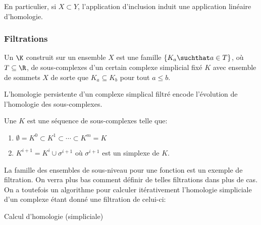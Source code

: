 \begin{remarque}
	En particulier, si $X \subset Y$, l'application d'inclusion induit une application linéaire d'homologie.
\end{remarque}

\subsubsection{Filtrations}
\begin{definition}
	Un  $\K$ construit sur un ensemble $X$ est une famille
	$\left\{K_{a} \suchthat a \in T\right\}$, où $T \subseteq \R$, de sous-complexes d'un
	certain complexe simplicial fixé $K$ avec ensemble de sommets $X$ de sorte que $K_{a} \subseteq K_{b}$
	pour tout $a \leq b$.
\end{definition}

L'homologie persistente d'un complexe simplical filtré encode l'évolution de l'homologie des sous-complexes.

\begin{definition}
	Une  $K$ est une séquence de sous-complexes telle que:
	\begin{enumerate}
		\item $\emptyset = K^{0} \subset K^{1} \subset \cdots \subset K^{m} = K$
		\item $K^{i + 1} = K^{i} \cup \sigma^{i + 1}$ où $\sigma^{i + 1}$ est un simplexe de $K$.
	\end{enumerate}
\end{definition}
La famille des ensembles de sous-niveau pour une fonction est un exemple de filtration.
On verra plus bas comment définir de telles filtrations dans plus de cas.
On a toutefois un algorithme pour calculer itérativement l'homologie simpliciale d'un complexe étant donné
une filtration de celui-ci:
\begin{algorithm}
	\caption{Calcul d'homologie (simpliciale)}
	\label{alg:betti_nop}
	\begin{algorithmic}
		\EndInput
		\Else
		\EndIf
		\EndFor
	\end{algorithmic}
\end{algorithm}

